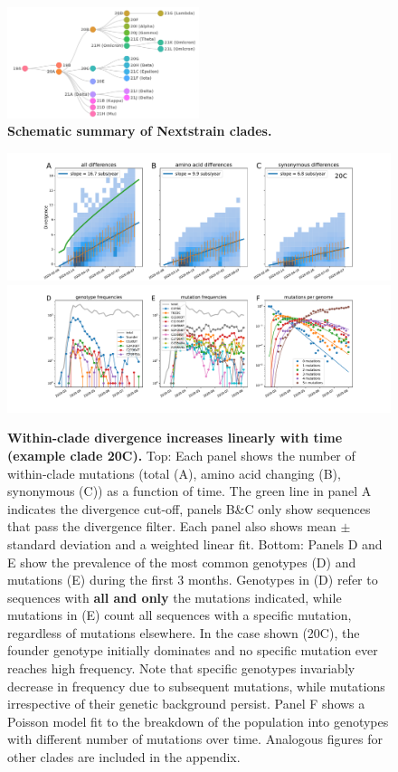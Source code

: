 \documentclass[aps,rmp, twocolumn]{revtex4}
\begin{document}
\begin{figure}
    \includegraphics[width=0.5\textwidth]{figures/clade_overview.png}
    \caption{{\bf Schematic summary of Nextstrain clades.}\label{fig:clade_overview}}
\end{figure}

\begin{figure}[tb]
    \includegraphics[width=\textwidth]{figures/rtt/20C_rtt.pdf}
    \includegraphics[width=\textwidth]{figures/counts/20C_counts.pdf}
    \caption{{\bf Within-clade divergence increases linearly with time (example clade 20C).} Top: Each panel shows the number of within-clade mutations (total (A), amino acid changing (B), synonymous (C)) as a function of time.
    The green line in panel A indicates the divergence cut-off, panels B\&C only show sequences that pass the divergence filter. Each panel also shows mean $\pm$ standard deviation and a weighted linear fit.
    Bottom: Panels D and E show the prevalence of the most common genotypes (D) and mutations (E) during the first 3 months. Genotypes in (D) refer to sequences with {\bf all and only} the mutations indicated, while mutations in (E) count all sequences with a specific mutation, regardless of mutations elsewhere.
    In the case shown (20C), the founder genotype initially dominates and no specific mutation ever reaches high frequency. Note that specific genotypes invariably decrease in frequency due to subsequent mutations, while mutations irrespective of their genetic background persist. Panel F shows a Poisson model fit to the breakdown of the population into genotypes with different number of mutations over time. Analogous figures for other clades are included in the appendix.
    \label{fig:within_clade}}
\end{figure}
\end{document}
